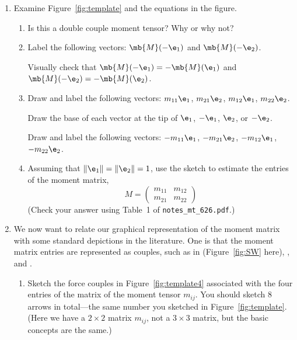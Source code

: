 \documentclass[11pt,titlepage,fleqn]{article}
\newcommand{\mtfile}{\texttt{notes\_mt\_626.pdf}}
\begin{document}
\begin{enumerate}
\item Examine Figure~\ref{fig:template} and the equations in the figure.

\begin{enumerate}
\item Is this a double couple moment tensor? Why or why not?

\item Label the following vectors: $\mb{M}(-\e_1)$ and $\mb{M}(-\e_2)$.

Visually check that $\mb{M}(-\e_1) = -\mb{M}(\e_1)$ and $\mb{M}(-\e_2) = -\mb{M}(\e_2)$.

\item Draw and label the following vectors: $m_{11}\e_1$, $m_{21}\e_2$, $m_{12}\e_1$, $m_{22}\e_2$.

Draw the base of each vector at the tip of $\e_1$, $-\e_1$, $\e_2$, or $-\e_2$.

Draw and label the following vectors: $-m_{11}\e_1$, $-m_{21}\e_2$, $-m_{12}\e_1$, $-m_{22}\e_2$.

\item Assuming that $\|\e_1\| = \|\e_2\| = 1$, use the sketch to estimate the entries of the moment matrix,
%
\begin{equation*}
M = \begin{pmatrix} m_{11} & m_{12} \\ m_{21} & m_{22} \end{pmatrix}
\end{equation*}
%
(Check your answer using Table~1 of \mtfile.)

\end{enumerate}

\item We now want to relate our graphical representation of the moment matrix with some standard depictions in the literature. One is that the moment matrix entries are represented as couples, such as in \citet[][Figure 4.4-4]{SteinWysession} (Figure~\ref{fig:SW} here), \citet[][Figure~9.2]{ShearerE2}, and \citet[][Figure 3.7]{AkiRichardsE2}.
%
\begin{enumerate}
\item Sketch the force couples in Figure~\ref{fig:template4} associated with the four entries of the matrix of the moment tensor $m_{ij}$. You should sketch 8 arrows in total---the same number you sketched in Figure~\ref{fig:template}.
(Here we have a $2 \times 2$ matrix $m_{ij}$, not a $3 \times 3$ matrix, but the basic concepts are the same.)


\end{enumerate}
\end{enumerate}
\end{document}
